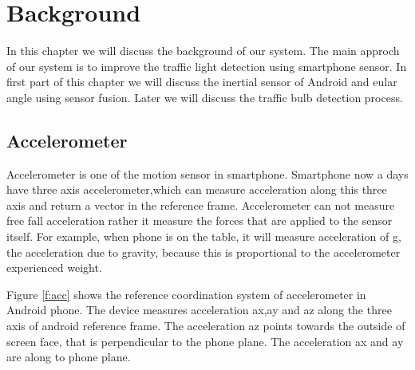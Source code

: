 \chapter{Background}
In this chapter we will discuss the background of our system.
The main approch of our system is to improve the traffic light detection using smartphone sensor.
In first part of this chapter we will discuss the inertial sensor of Android and eular angle using sensor fusion.
Later we will discuss the traffic bulb detection process.

\section{Accelerometer}
Accelerometer is one of the motion sensor in smartphone.
Smartphone now a days have three axis accelerometer,which can measure acceleration along this three axis and return a vector in the reference frame.
Accelerometer can not measure free fall acceleration rather it measure the forces that are applied to the sensor itself.
For example, when phone is on the table, it will measure acceleration of g, the acceleration due to gravity, because this is proportional to the accelerometer experienced weight.

Figure \ref{f:acc} shows the reference coordination system of accelerometer in Android phone.
The device measures acceleration ax,ay and az along the three axis of android reference frame.
The acceleration az points towards the outside of screen face, that is perpendicular to the phone plane.
The acceleration ax and ay are along to phone plane.

